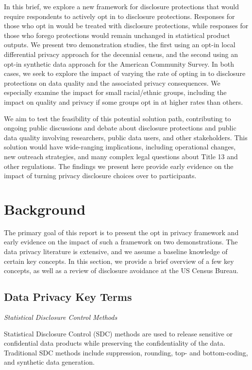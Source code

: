 \documentclass[
]{urban-formatting}
\begin{document}
In this brief, we explore a new framework for disclosure protections
that would require respondents to actively opt in to disclosure
protections. Responses for those who opt in would be treated with
disclosure protections, while responses for those who forego protections
would remain unchanged in statistical product outputs. We present two
demonstration studies, the first using an opt-in local differential
privacy approach for the decennial census, and the second using an
opt-in synthetic data approach for the American Community Survey. In
both cases, we seek to explore the impact of varying the rate of opting
in to disclosure protections on data quality and the associated privacy
consequences. We especially examine the impact for small racial/ethnic
groups, including the impact on quality and privacy if some groups opt
in at higher rates than others.

We aim to test the feasibility of this potential solution path,
contributing to ongoing public discussions and debate about disclosure
protections and public data quality involving researchers, public data
users, and other stakeholders. This solution would have wide-ranging
implications, including operational changes, new outreach strategies,
and many complex legal questions about Title 13 and other regulations.
The findings we present here provide early evidence on the impact of
turning privacy disclosure choices over to participants.

\section{Background}

The primary goal of this report is to present the opt in privacy
framework and early evidence on the impact of such a framework on two
demonstrations. The data privacy literature is extensive, and we assume
a baseline knowledge of certain key concepts. In this section, we
provide a brief overview of a few key concepts, as well as a review of
disclosure avoidance at the US Census Bureau.

\subsection{Data Privacy Key Terms}

\emph{Statistical Disclosure Control Methods}

Statistical Disclosure Control (SDC) methods are used to release
sensitive or confidential data products while preserving the
confidentiality of the data. Traditional SDC methods include
suppression, rounding, top- and bottom-coding, and synthetic data
generation.
\end{document}
